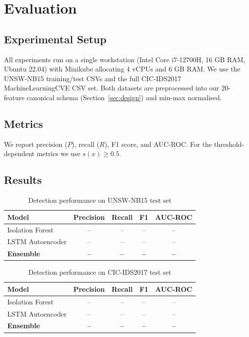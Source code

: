 \section{Evaluation}
\label{sec:eval}

\subsection{Experimental Setup}
All experiments run on a single workstation (Intel Core i7-12700H,
16 GB RAM, Ubuntu 22.04) with Minikube allocating 4 vCPUs and 6 GB RAM.
We use the UNSW-NB15 training/test CSVs and the full CIC-IDS2017
MachineLearningCVE CSV set.
Both datasets are preprocessed into our 20-feature canonical schema
(Section~\ref{sec:design}) and min-max normalised.

\subsection{Metrics}
We report precision ($P$), recall ($R$), F1 score, and AUC-ROC.
For the threshold-dependent metrics we use $s(x) \geq 0.5$.

\subsection{Results}

\begin{table}[htbp]
  \centering
  \caption{Detection performance on UNSW-NB15 test set}
  \label{tab:unsw_results}
  \begin{tabular}{lcccc}
    \toprule
    Model & Precision & Recall & F1 & AUC-ROC \\
    \midrule
    Isolation Forest  & --  & --  & --  & -- \\
    LSTM Autoencoder  & --  & --  & --  & -- \\
    \textbf{Ensemble} & \textbf{--} & \textbf{--} & \textbf{--} & \textbf{--} \\
    \bottomrule
  \end{tabular}
\end{table}

\begin{table}[htbp]
  \centering
  \caption{Detection performance on CIC-IDS2017 test set}
  \label{tab:cic_results}
  \begin{tabular}{lcccc}
    \toprule
    Model & Precision & Recall & F1 & AUC-ROC \\
    \midrule
    Isolation Forest  & --  & --  & --  & -- \\
    LSTM Autoencoder  & --  & --  & --  & -- \\
    \textbf{Ensemble} & \textbf{--} & \textbf{--} & \textbf{--} & \textbf{--} \\
    \bottomrule
  \end{tabular}
\end{table}

